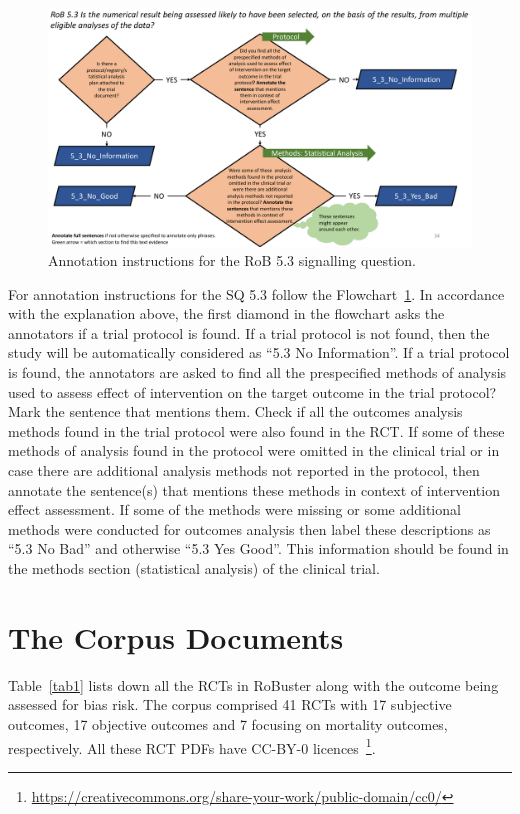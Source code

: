 \documentclass[sn-mathphys,Numbered]{sn-jnl}%
\begin{document}
%
%
%
\begin{figure}[htbp]
    \centering
    \includegraphics[width=\textwidth]{figures/5_3.pdf}
    \caption{Annotation instructions for the RoB 5.3 signalling question.}
    \label{fig:5_3}
\end{figure}
%
%
%

For annotation instructions for the SQ 5.3 follow the Flowchart~\ref{fig:5_3}.
In accordance with the explanation above, the first diamond in the flowchart asks the annotators if a trial protocol is found.
If a trial protocol is not found, then the study will be automatically considered as ``5.3 No Information''.
If a trial protocol is found, the annotators are asked to find all the prespecified methods of analysis used to assess effect of intervention on the target outcome in the trial protocol?
Mark the sentence that mentions them.
Check if all the outcomes analysis methods found in the trial protocol were also found in the RCT.
If some of these  methods of analysis found in the protocol were omitted in the clinical trial or in case there are additional analysis methods not reported in the protocol, then annotate the sentence(s) that mentions these methods in context of intervention effect assessment.
If some of the methods were missing or some additional methods were conducted for outcomes analysis then label these descriptions as ``5.3 No Bad'' and otherwise ``5.3 Yes Good''.
This information should be found in the methods section (statistical analysis) of the clinical trial.
%
%
%
\section*{The Corpus Documents}
\label{sec:corpus}
%
Table~\ref{tab1} lists down all the RCTs in RoBuster along with the outcome being assessed for bias risk.
The corpus comprised 41 RCTs with 17 subjective outcomes, 17 objective outcomes and 7 focusing on mortality outcomes, respectively.
All these RCT PDFs have CC-BY-0 licences~\footnote{\url{https://creativecommons.org/share-your-work/public-domain/cc0/}}.
\end{document}
